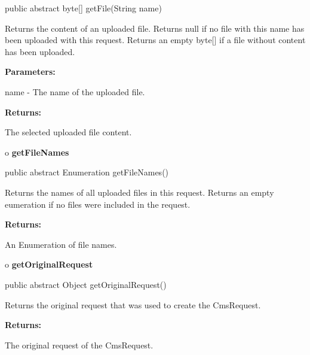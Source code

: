 \begin{PRE}
 public abstract byte[] getFile(String name)
\end{PRE}

\begin{description}
\htmlDD Returns the content of an uploaded file. Returns null if no file with
this name has been uploaded with this request. Returns an empty byte[] if a
file without content has been uploaded. 

\begin{description}
\item {\bf Parameters:}  

name - The name of the uploaded file.  
\item {\bf Returns:}  

The selected uploaded file content.  
\end{description}

\end{description}

o {\bf getFileNames} 

\begin{PRE}
 public abstract Enumeration getFileNames()
\end{PRE}

\begin{description}
\htmlDD Returns the names of all uploaded files in this request. Returns an
empty eumeration if no files were included in the request. 

\begin{description}
\item {\bf Returns:}  

An Enumeration of file names.  
\end{description}

\end{description}

o {\bf getOriginalRequest} 

\begin{PRE}
 public abstract Object getOriginalRequest()
\end{PRE}

\begin{description}
\htmlDD Returns the original request that was used to create the CmsRequest. 

\begin{description}
\item {\bf Returns:}  

The original request of the CmsRequest.  
\end{description}

\end{description}

